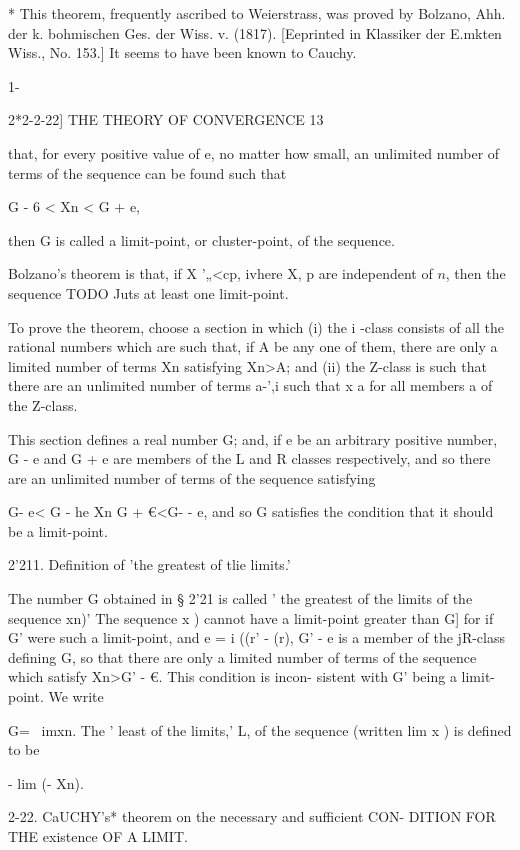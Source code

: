 * This theorem, frequently ascribed to Weierstrass, was proved by
Bolzano, Ahh. der k. bohmischen Ges. der Wiss. v. (1817). [Eeprinted
in Klassiker der E.mkten Wiss., No. 153.] It seems to have been known
to Cauchy.



1-



2*2-2-22] THE THEORY OF CONVERGENCE 13

that, for every positive value of e, no matter how small, an unlimited
number of terms of the sequence can be found such that

G - 6 < Xn < G + e,

then G is called a limit-point, or cluster-point, of the sequence.

Bolzano's theorem is that, if X '„<cp, ivhere X, p are independent of
$n$, then the sequence TODO Juts at least one limit-point.

To prove the theorem, choose a section in which (i) the i -class
consists of all the rational numbers which are such that, if A be any
one of them, there are only a limited number of terms Xn satisfying
Xn>A; and (ii) the Z-class is such that there are an unlimited number
of terms a-',i such that x a for all members a of the Z-class.

This section defines a real number G; and, if e be an arbitrary
positive number, G - e and G + e are members of the L and R classes
respectively, and so there are an unlimited number of terms of the
sequence satisfying

G- e< G - he Xn G + €<G- - e, and so G satisfies the condition that it
should be a limit-point.

2'211. Definition of 'the greatest of tlie limits.'

The number G obtained in § 2'21 is called ' the greatest of the limits
of the sequence xn)' The sequence x ) cannot have a limit-point
greater than G] for if G' were such a limit-point, and e = i ((r' -
(r), G' - e is a member of the jR-class defining G, so that there are
only a limited number of terms of the sequence which satisfy Xn>G' -
€. This condition is incon- sistent with G' being a limit-point. We
write

G= \ imxn. The ' least of the limits,' L, of the sequence (written lim
x ) is defined to be

- lim (- Xn).

2-22. CaUCHY's* theorem on the necessary and sufficient CON- DITION
FOR THE existence OF A LIMIT.

